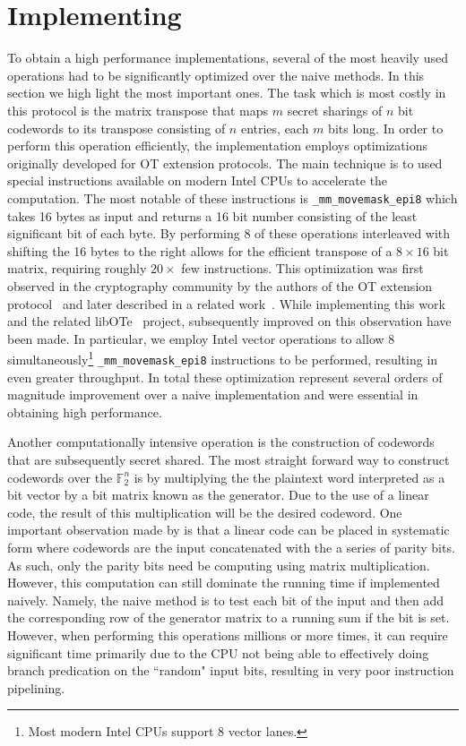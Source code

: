 
\section{Implementing}

To obtain a high performance implementations, several of the most heavily used operations had to be significantly optimized over the naive methods. In this section we high light the most important ones. The task which is most costly in this protocol is the matrix transpose that maps $m$ secret sharings of $n$ bit codewords to its transpose consisting of $n$ entries, each $m$ bits long. In order to perform this operation efficiently, the implementation employs  optimizations originally developed for OT extension protocols. The main technique is to used special instructions available on modern Intel CPUs to accelerate the computation. The most notable of these instructions is \texttt{\_mm\_movemask\_epi8} which takes 16 bytes as input and returns a 16 bit number consisting of the least significant bit of each byte. By performing 8 of these operations interleaved with shifting the 16 bytes to the right allows for the efficient transpose of a $8\times 16$ bit matrix, requiring roughly $20\times$ few instructions. This optimization was first observed in the cryptography community by the authors of the OT extension protocol~\cite{DBLP:conf/crypto/KellerOS15} and later described in a related work~\cite{DBLP:conf/ccs/KellerOS16}. While implementing this work and the related libOTe~\cite{libOTe} project, subsequently improved on this observation have been made. In particular, we employ Intel vector operations to allow 8  simultaneously\footnote{Most modern Intel CPUs support 8 vector lanes.} \texttt{\_mm\_movemask\_epi8} instructions to be performed, resulting in even greater throughput. In total these optimization represent several orders of magnitude improvement over a naive implementation and were essential in obtaining high performance.


Another computationally intensive operation is the construction of codewords that are subsequently secret shared. The most straight forward way to construct codewords over the $\mathbb{F}_2^n$ is by multiplying the the plaintext word interpreted as a bit vector by a bit matrix known as the generator. Due to the use of a linear code, the result of this multiplication will be the desired codeword. One important observation made by \cite{DBLP:conf/tcc/FrederiksenJNT16} is that a linear code can be placed in systematic form where codewords are the input concatenated with the a series of parity bits. As such, only the parity bits need be computing using matrix multiplication. However, this computation can still dominate the running time if implemented naively. Namely, the naive method is to test each bit of the input and then add the corresponding row of the generator matrix to a running sum if the bit is set. However, when performing this operations millions or more times, it can require significant time primarily due to the CPU not being able to effectively doing branch predication on the ``random" input bits, resulting in very poor instruction pipelining. 

